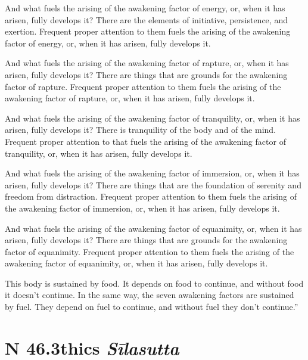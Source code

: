 \documentclass[12pt,openany]{book}%
\newcommand*{\suttatitleacronym}[1]{\smaller[2]{#1}\vspace*{.3em}}
\newcommand*{\suttatitletranslation}[1]{\linebreak{#1}}
\newcommand*{\suttatitleroot}[1]{\linebreak\smaller[2]\itshape{#1}}
\newcommand*{\tocacronym}[1]{\hspace*{-3.3em}{#1}\quad}
\newcommand*{\toctranslation}[1]{#1}
\newcommand*{\tocroot}[1]{(\textit{#1})}
\begin{document}
And what fuels the arising of the awakening factor of energy, or, when it has arisen, fully develops it? There are the elements of initiative, persistence, and exertion. Frequent proper attention to them fuels the arising of the awakening factor of energy, or, when it has arisen, fully develops it. 

And what fuels the arising of the awakening factor of rapture, or, when it has arisen, fully develops it? There are things that are grounds for the awakening factor of rapture. Frequent proper attention to them fuels the arising of the awakening factor of rapture, or, when it has arisen, fully develops it. 

And what fuels the arising of the awakening factor of tranquility, or, when it has arisen, fully develops it? There is tranquility of the body and of the mind. Frequent proper attention to that fuels the arising of the awakening factor of tranquility, or, when it has arisen, fully develops it. 

And what fuels the arising of the awakening factor of immersion, or, when it has arisen, fully develops it? There are things that are the foundation of serenity and freedom from distraction. Frequent proper attention to them fuels the arising of the awakening factor of immersion, or, when it has arisen, fully develops it. 

And what fuels the arising of the awakening factor of equanimity, or, when it has arisen, fully develops it? There are things that are grounds for the awakening factor of equanimity. Frequent proper attention to them fuels the arising of the awakening factor of equanimity, or, when it has arisen, fully develops it. 

This body is sustained by food. It depends on food to continue, and without food it doesn’t continue. In the same way, the seven awakening factors are sustained by fuel. They depend on fuel to continue, and without fuel they don’t continue.” 

%
\section*{{\suttatitleacronym SN 46.3}{\suttatitletranslation Ethics }{\suttatitleroot Sīlasutta}}
\addcontentsline{toc}{section}{\tocacronym{SN 46.3} \toctranslation{Ethics } \tocroot{Sīlasutta}}
\end{document}
